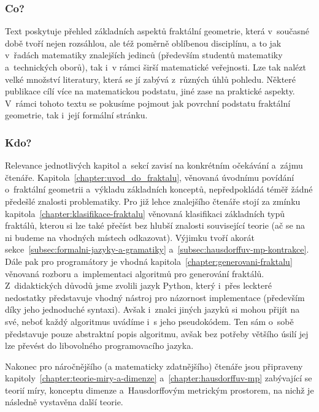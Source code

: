 \label{chapter:predmluva}

\subsubsection{Co?}

Text poskytuje přehled základních aspektů fraktální geometrie, která v~současné době tvoří nejen rozsáhlou, ale též poměrně oblíbenou disciplínu, a to jak v~řadách matematiky znalejších jedinců (především studentů matematiky a~technických oborů), tak i~v rámci širší matematické veřejnosti. Lze tak nalézt velké množství literatury, která se jí zabývá z~různých úhlů pohledu. Některé publikace cílí více na matematickou podstatu, jiné zase na praktické aspekty. V~rámci tohoto textu se pokusíme pojmout jak povrchní podstatu fraktální geometrie, tak i~její formální stránku.

\subsubsection{Kdo?}

Relevance jednotlivých kapitol a~sekcí zavisí na konkrétním očekávání a~zájmu čtenáře. Kapitola~\ref{chapter:uvod_do_fraktalu}, věnovaná úvodnímu povídání o~fraktální geometrii a~výkladu základních konceptů, nepředpokládá téměř žádné předešlé znalosti problematiky. Pro již lehce znalejšího čtenáře stojí za zmínku kapitola~\ref{chapter:klasifikace-fraktalu} věnovaná klasifikaci základních typů fraktálů, kterou si lze také přečíst bez hlubší znalosti související teorie (ač se na ni budeme na vhodných místech odkazovat). Výjimku tvoří akorát sekce~\ref{subsec:formalni-jazyky-a-gramatiky} a~\ref{subsec:hausdorffuv-mp-kontrakce}. Dále pak pro programátory je vhodná kapitola~\ref{chapter:generovani-fraktalu} věnovaná rozboru a~implementaci algoritmů pro generování fraktálů. Z~didaktických důvodů jsme zvolili jazyk Python, který i~přes leckteré nedostatky představuje vhodný nástroj pro názornost implementace (především díky jeho jednoduché syntaxi). Avšak i~znalci jiných jazyků si mohou přijít na své, neboť každý algoritmus uvádíme i~s jeho pseudokódem. Ten sám o~sobě představuje pouze abstraktní popis algoritmu, avšak bez potřeby většího úsilí jej lze převést do libovolného programovacího jazyka.

Nakonec pro náročnějšího (a matematicky zdatnějšího) čtenáře jsou připraveny kapitoly~\ref{chapter:teorie-miry-a-dimenze} a~\ref{chapter:hausdorffuv-mp} zabývající se teorií míry, konceptu dimenze a~Hausdorffovým metrickým prostorem, na nichž je následně vystavěna další teorie.

